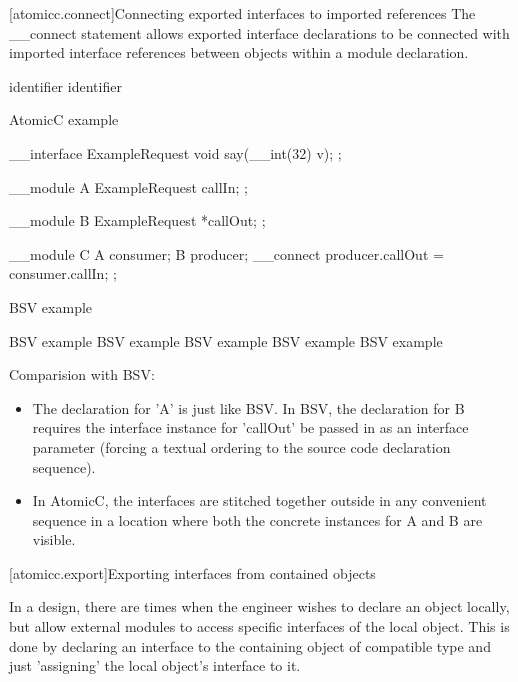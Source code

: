 [atomicc.connect]{Connecting exported interfaces to imported references}
The __connect statement allows exported interface declarations to be connected
with imported interface references between objects within a module declaration.

\begin{bnf}
\br
     identifier \terminal{=} identifier \terminal{;}
\end{bnf}

\begin{example}
\begin{multicols}{2}
AtomicC example
\begin{codeblock}
     __interface ExampleRequest {
         void say(__int(32) v);
     };

     __module A {
          ExampleRequest callIn;
     };

     __module B {
         ExampleRequest *callOut;
     };

     __module C {
         A consumer;
         B producer;
         __connect producer.callOut = consumer.callIn;
     };
\end{codeblock}
\columnbreak
BSV example
\begin{codeblock}
    BSV example
    BSV example
    BSV example
    BSV example
    BSV example
\end{codeblock}
\end{multicols}
\end{example}

Comparision with BSV:
\begin{itemize}
\item The declaration for 'A' is just like BSV.
In BSV, the declaration for B requires the interface instance for 'callOut' be passed in as
an interface parameter (forcing a textual ordering to the source code
declaration sequence).
\item In AtomicC, the interfaces are stitched together outside in any
convenient sequence in a location where both the concrete instances
for A and B are visible.
\end{itemize}

[atomicc.export]{Exporting interfaces from contained objects}

In a design, there are times when the engineer wishes to declare an object locally,
but allow external modules to access specific interfaces of the local object.
This is done by declaring an interface to the containing object of compatible
type and just 'assigning' the local object's interface to it.

